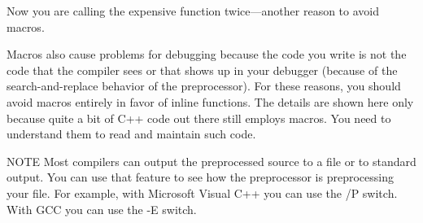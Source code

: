 Now you are calling the expensive function twice—another reason to avoid macros.

Macros also cause problems for debugging because the code you write is not the code that the compiler sees or that shows up in your debugger (because of the search-and-replace behavior of the preprocessor). For these reasons, you should avoid macros entirely in favor of inline functions. The details are shown here only because quite a bit of C++ code out there still employs macros. You need to understand them to read and maintain such code.

\begin{myNotic}{NOTE}
Most compilers can output the preprocessed source to a file or to standard output. You can use that feature to see how the preprocessor is preprocessing your file. For example, with Microsoft Visual C++ you can use the /P switch. With GCC you can use the -E switch.
\end{myNotic}





